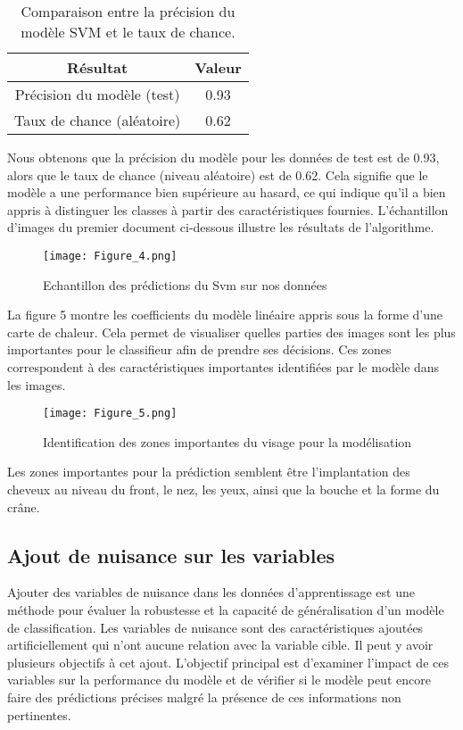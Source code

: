 \documentclass{article}
\begin{document}
\begin{table}[ht]
\centering
\begin{tabular}{|c|c|}
\hline
\textbf{Résultat}          & \textbf{Valeur} \\ \hline
Précision du modèle (test)  & 0.93            \\ \hline
Taux de chance (aléatoire)  & 0.62            \\ \hline
\end{tabular}
\caption{Comparaison entre la précision du modèle SVM et le taux de chance.}
\label{tab:model_vs_chance}
\end{table}

Nous obtenons que la précision du modèle pour les données de test est de 0.93, alors que le taux de chance (niveau aléatoire) est de 0.62. Cela signifie que le modèle a une performance bien supérieure au hasard, ce qui indique qu'il a bien appris à distinguer les classes à partir des caractéristiques fournies.
\newpage
L'échantillon d'images du premier document ci-dessous illustre les résultats de l'algorithme.
\begin{figure}[H]
    \centering
    \texttt{[image: Figure\_4.png]}
    \caption{Echantillon des prédictions du Svm sur nos données}
    \label{fig:enter-label}
\end{figure}
La figure 5 montre les coefficients du modèle linéaire appris sous la forme d'une carte de chaleur. Cela permet de visualiser quelles parties des images sont les plus importantes pour le classifieur afin de prendre ses décisions. Ces zones correspondent à des caractéristiques importantes identifiées par le modèle dans les images.

\begin{figure}[H]
    \centering
    \texttt{[image: Figure\_5.png]}
    \caption{Identification des zones importantes du visage pour la modélisation}
    \label{fig:enter-label}
\end{figure}
Les zones importantes pour la prédiction semblent être l'implantation des cheveux au niveau du front, le nez, les yeux, ainsi que la bouche et la forme du crâne.

\subsection{Ajout de nuisance sur les variables}

Ajouter des variables de nuisance dans les données d'apprentissage est une méthode pour évaluer la robustesse et la capacité de généralisation d'un modèle de classification. Les variables de nuisance sont des caractéristiques ajoutées artificiellement qui n'ont aucune relation avec la variable cible. Il peut y avoir plusieurs objectifs à cet ajout.  L'objectif principal est d'examiner l'impact de ces variables sur la performance du modèle et de vérifier si le modèle peut encore faire des prédictions précises malgré la présence de ces informations non pertinentes.
\end{document}
